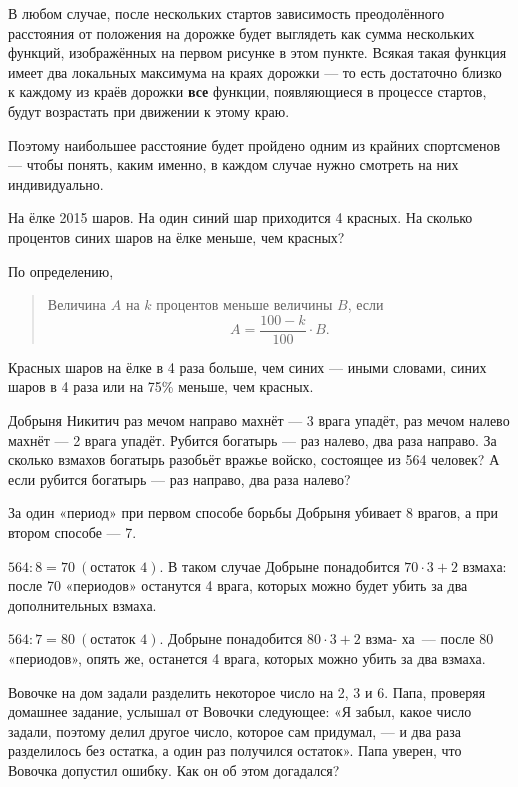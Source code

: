 \begin{itemize}
	В любом случае, после нескольких стартов зависимость преодолённого расстояния от положения на дорожке будет выглядеть как сумма нескольких функций, изображённых на первом рисунке в этом пункте. Всякая такая функция имеет два локальных максимума на краях дорожки — то есть достаточно близко к каждому из краёв дорожки {\bfseries все} функции, появляющиеся в процессе стартов, будут возрастать при движении к этому краю.
	
	Поэтому наибольшее расстояние будет пройдено одним из крайних спортсменов — чтобы понять, каким именно, в каждом случае нужно смотреть на них индивидуально.

\end{itemize}


\begin{itemize}

	\itA На ёлке 2015 шаров. На один синий шар приходится 4 красных. На сколько процентов синих шаров на ёлке меньше, чем красных?
	
	\itr По определению,
	
	\begin{quote}
		Величина $A$ на $k$ процентов меньше величины $B$, если
		$$A = \frac{100-k}{100} \cdot B.$$
	\end{quote}
	
	Красных шаров на ёлке в 4 раза больше, чем синих — иными словами, синих шаров в 4 раза или на 75\% меньше, чем красных.

	\itB Добрыня Никитич раз мечом направо махнёт — 3 врага упадёт, раз мечом налево махнёт — 2 врага упадёт. Рубится богатырь — раз налево, два раза направо. За сколько взмахов богатырь разобьёт вражье войско, состоящее из 564 человек? А если рубится богатырь — раз направо, два раза налево?
	
	\itr За один «период» при первом способе борьбы Добрыня убивает 8 врагов, а при втором способе — 7.
	
	\subitem $564 : 8 = 70\ (\text{остаток\ } 4)$. В таком случае Добрыне понадобится $70 \cdot 3 + 2$ взмаха: после 70 «периодов» останутся 4 врага, которых можно будет убить за два дополнительных взмаха.
	
	\subitem $564 : 7 = 80\ (\text{остаток\ } 4)$. Добрыне понадобится $80 \cdot 3 + 2$ взма- ха~— после 80 «периодов», опять же, останется 4 врага, которых \linebreak можно убить за два взмаха.
	
	\itC Вовочке на дом задали разделить некоторое число на 2, 3 и 6. Папа, проверяя домашнее задание, услышал от Вовочки следующее: «Я забыл, какое число задали, поэтому делил другое число, которое сам придумал, — и два раза разделилось без остатка, а один раз получился остаток». Папа уверен, что Вовочка допустил ошибку. Как он об этом догадался?
	

\end{itemize}
